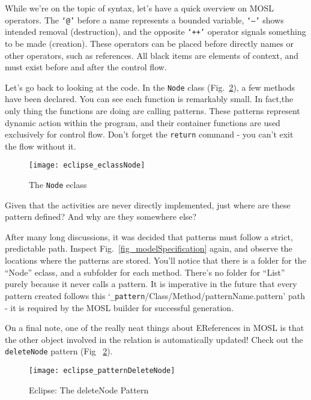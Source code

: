 While we're on the topic of syntax, let's have a quick overview on MOSL operators. The \texttt{`@'} before a name represents a bounded variable, \texttt{`--'}
shows intended removal (destruction), and the opposite \texttt{`++'} operator signals something to be made (creation). These operators can be placed before
directly names or other operators, such as references.  All black items are elements of context, and must exist before and after the control flow.

Let's go back to looking at the code. In the \texttt{Node} class (Fig.~\ref{fig_patternDeleteNode}), a few methods have been declared. You can see each function
is remarkably small. In fact,the only thing the functions are doing are calling patterns. These patterns represent dynamic action within the program, and their
container functions are used exclusively for control flow. Don't forget the \texttt{return} command - you can't exit the flow without it.

 \begin{figure}[htbp]
  \centering
  \texttt{[image: eclipse\_eclassNode]}
  \caption{The \texttt{Node} eclass}
  \label{fig_eclassNode}
\end{figure}

Given that the activities are never directly implemented, just where are these pattern defined? And why are they somewhere else?

After many long discussions, it was decided that patterns must follow a strict, predictable path. Inspect Fig.~\ref{fig_modelSpecification} again, and observe
the locations where the patterns are stored. You'll notice that there is a folder for the ``Node'' eclass, and a subfolder for each method. There's no folder
for ``List'' purely because it never calls a pattern. It is imperative in the future that every pattern created follows this
`\texttt{\_pattern}/Class/Method/patternName.pattern' path - it is required by the MOSL builder for successful generation.

On a final note, one of the really neat things about EReferences in MOSL is that the other object involved in the relation is automatically updated! Check out
the \texttt{deleteNode} pattern (Fig ~\ref{fig_patternDeleteNode}).

 \begin{figure}[htbp]
  \centering
  \texttt{[image: eclipse\_patternDeleteNode]}
  \caption{Eclipse: The deleteNode Pattern}
  \label{fig_patternDeleteNode}
\end{figure}

